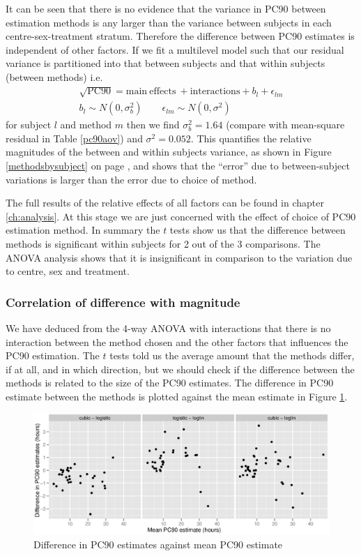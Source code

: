 It can be seen that there is no evidence that the variance in PC90 between estimation methods is any larger than the variance between subjects in each centre-sex-treatment stratum. Therefore the difference between PC90 estimates is independent of other factors. If we fit a multilevel model such that our residual variance is partitioned into that between subjects and that within subjects (between methods) i.e.
\begin{eqnarray*}
\sqrt{\mathrm{PC}90}=\mathrm{main\ effects\ + interactions} + b_{l} + \epsilon_{lm}\\
b_{l}\sim N(0,\sigma_{b}^{2})\quad\quad\epsilon_{lm}\sim N(0,\sigma^{2})
\end{eqnarray*}
for subject $l$ and method $m$ then we find $\sigma_{b}^{2}=1.64$ (compare with mean-square residual in Table \ref{pc90aov}) and $\sigma^{2}=0.052$. This quantifies the relative magnitudes of the between and within subjects variance, as shown in Figure \ref{methodsbysubject} on page \pageref{methodsbysubject}, and shows that the ``error'' due to between-subject variations is larger than the error due to choice of method.

The full results of the relative effects of all factors can be found in chapter \ref{ch:analysis}. At this stage we are just concerned with the effect of choice of PC90 estimation method. In summary the $t$ tests show us that the difference between methods is significant within subjects for 2 out of the 3 comparisons. The ANOVA analysis shows that it is insignificant in comparison to the variation due to centre, sex and treatment.
\subsubsection*{Correlation of difference with magnitude}
We have deduced from the 4-way ANOVA with interactions that there is no interaction between the method chosen and the other factors that influences the PC90 estimation. The $t$ tests told us the average amount that the methods differ, if at all, and in which direction, but we should check if the difference between the methods is related to the size of the PC90 estimates. The difference in PC90 estimate between the methods is plotted against the mean estimate in Figure \ref{pc90est-cor}.
\begin{figure}[h]
\includegraphics[width=150mm]{pc90est-cor.eps} 
\caption{Difference in PC90 estimates against mean PC90 estimate}
\label{pc90est-cor}
\end{figure}

